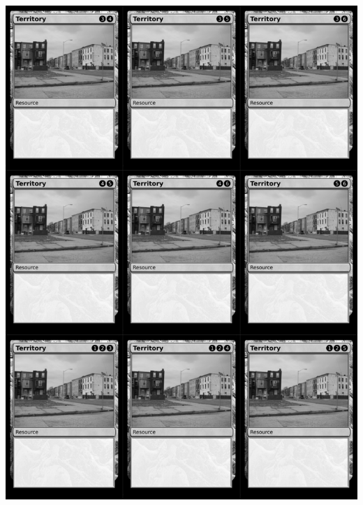 \documentclass[a4paper]{article}
\begin{document}
\newpage

\begin{center}
	\centering
	\includegraphics[width=200.5mm,height=280.7mm]{output/temp/page25.png}
\end{center}
\end{document}
